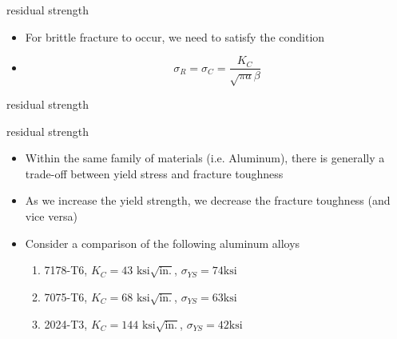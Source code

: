 \documentclass[10pt]{beamer}
\begin{document}
\begin{frame}{residual strength}
	\begin{itemize}[<+->]
		\item For brittle fracture to occur, we need to satisfy the condition
		\item
		\begin{equation}
		\sigma_R = \sigma_C = \frac{K_C}{\sqrt{\pi a}\beta}
		\end{equation}
	\end{itemize}
\end{frame}

\begin{frame}{residual strength}
	\begin{figure}
	\end{figure}
\end{frame}

\begin{frame}{residual strength}
	\begin{itemize}[<+->]
		\item Within the same family of materials (i.e. Aluminum), there is generally a trade-off between yield stress and fracture toughness
		\item As we increase the yield strength, we decrease the fracture toughness (and vice versa)
		\item Consider a comparison of the following aluminum alloys
		\begin{enumerate}
			\item 7178-T6, $K_C = 43 \text{ ksi} \sqrt{\text{in.}}$, $\sigma_{YS} = 74 \text{ksi}$
			\item 7075-T6, $K_C = 68 \text{ ksi} \sqrt{\text{in.}}$, $\sigma_{YS} = 63 \text{ksi}$
			\item 2024-T3, $K_C = 144 \text{ ksi} \sqrt{\text{in.}}$, $\sigma_{YS} = 42 \text{ksi}$
		\end{enumerate}
	\end{itemize}
\end{frame}
\end{document}

